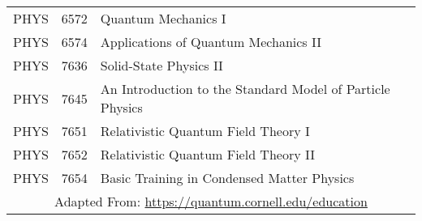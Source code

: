 {\begin{tabular}{ |p{1.5cm}||p{3cm}|p{9cm}| }
PHYS & 6572 & Quantum Mechanics I\\
PHYS & 6574 & Applications of Quantum Mechanics II\\
PHYS & 7636 & Solid-State Physics II\\
PHYS & 7645 & An Introduction to the Standard Model of Particle Physics\\
PHYS & 7651 & Relativistic Quantum Field Theory I\\
PHYS & 7652 & Relativistic Quantum Field Theory II\\
PHYS & 7654 & Basic Training in Condensed Matter Physics\\
\hline
 \multicolumn{3}{|c|}{Adapted From: \url{https://quantum.cornell.edu/education}} \\
\hline
\end{tabular}
}